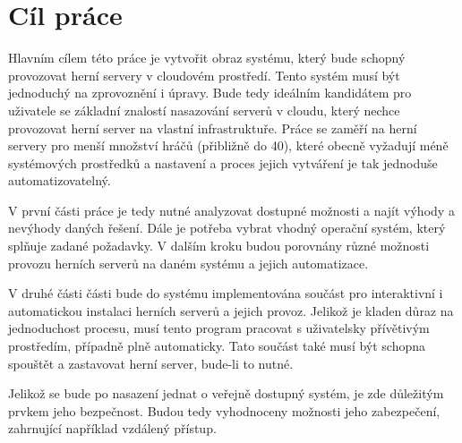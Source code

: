 \chapter{Cíl práce}

Hlavním cílem této práce je vytvořit obraz systému, který bude schopný provozovat herní servery v cloudovém prostředí.
Tento systém musí být jednoduchý na zprovoznění i úpravy. Bude tedy ideálním kandidátem pro uživatele se základní znalostí
nasazování serverů v cloudu, který nechce provozovat herní server na vlastní infrastruktuře.
Práce se zaměří na herní servery pro menší množství hráčů (přibližně do 40), které obecně vyžadují méně systémových prostředků a nastavení
a proces jejich vytváření je tak jednoduše automatizovatelný.

V první části práce je tedy nutné analyzovat dostupné možnosti a najít výhody a nevýhody daných řešení. Dále je potřeba vybrat
vhodný operační systém, který splňuje zadané požadavky. V dalším kroku budou porovnány různé možnosti provozu herních serverů
na daném systému a jejich automatizace.

V druhé části části bude do systému implementována součást pro interaktivní i automatickou instalaci herních serverů a jejich provoz. Jelikož je kladen důraz
na jednoduchost procesu, musí tento program pracovat s uživatelsky přívětivým prostředím, případně plně automaticky.
Tato součást také musí být schopna spouštět a zastavovat herní server, bude-li to nutné.

Jelikož se bude po nasazení jednat o veřejně dostupný systém, je zde důležitým prvkem jeho bezpečnost. Budou tedy vyhodnoceny možnosti
jeho zabezpečení, zahrnující například vzdálený přístup.
